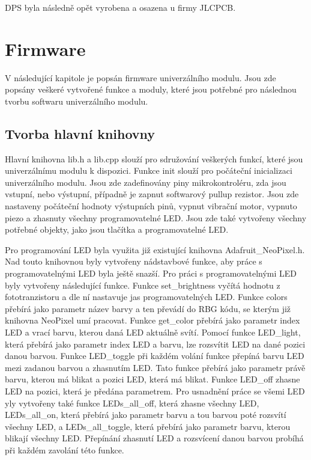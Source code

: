 DPS byla následně opět vyrobena a osazena u firmy JLCPCB. 

\chapter{Firmware}
V následující kapitole je popsán firmware univerzálního modulu. Jsou zde popsány veškeré vytvořené funkce a moduly, které jsou potřebné pro následnou tvorbu softwaru univerzálního modulu. 


\section{Tvorba hlavní knihovny}
Hlavní knihovna lib.h a lib.cpp slouží pro sdružování veškerých funkcí, které jsou univerzálnímu modulu k dispozici. Funkce init slouží pro počáteční inicializaci univerzálního modulu. Jsou zde 
zadefinovány piny mikrokontroléru, zda jsou vstupní, nebo výstupní, případně je zapnut softwarový pullup rezistor. Jsou zde nastaveny počáteční hodnoty výstupních pinů, vypnut vibrační motor, vypnuto 
piezo a zhasnuty všechny programovatelné LED. Jsou zde také vytvořeny všechny potřebné objekty, jako jsou tlačítka a programovatelné LED. 

Pro programování LED byla využita již existující knihovna Adafruit\_NeoPixel.h. Nad touto knihovnou byly vytvořeny nádstavbové funkce, aby práce s programovatelnými LED byla ještě snazší. 
Pro práci s programovatelnými LED byly vytvořeny následující funkce. Funkce set\_brightness vyčítá hodnotu z fototranzistoru a dle ní nastavuje jas programovatelných LED. Funkce colors přebírá jako
parametr název barvy a ten převádí do RBG kódu, se kterým již knihovna NeoPixel umí pracovat. Funkce get\_color přebírá jako parametr index LED a vrací barvu, kterou daná LED aktuálně svítí. 
Pomocí funkce LED\_light, která přebírá jako parametr index LED a barvu, lze rozsvítit LED na dané pozici danou barvou. Funkce LED\_toggle při každém volání funkce přepíná barvu LED mezi zadanou barvou 
a zhasnutím LED. Tato funkce přebírá jako parametr právě barvu, kterou má blikat a pozici LED, která má blikat. Funkce LED\_off zhasne LED na pozici, která je předána parametrem. Pro usnadnění práce 
se všemi LED yly vytvořeny také funkce LEDs\_all\_off, která zhasne všechny LED, LEDs\_all\_on, která přebírá jako parametr barvu a tou barvou poté rozsvítí všechny LED, a LEDs\_all\_toggle, která přebírá 
jako parametr barvu, kterou blikají všechny LED. Přepínání zhasnutí LED a rozsvícení danou barvou probíhá při každém zavolání této funkce. 

